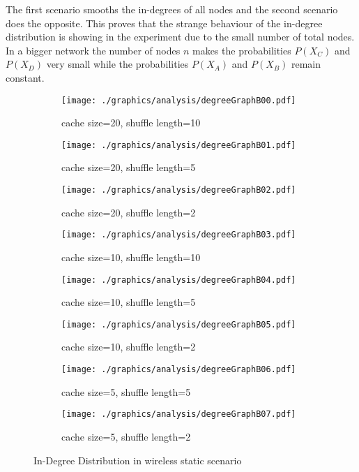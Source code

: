 The first scenario smooths the in-degrees of all nodes and the second
scenario does the opposite. This proves that the strange behaviour of the
in-degree distribution is showing in the experiment due to the small number of
total nodes. In a bigger network the number of nodes $n$ makes the
probabilities $P(X_C)$ and $P(X_D)$ very small while the probabilities $P(X_A)$
and $P(X_B)$ remain constant.

\begin{figure}
\begin{subfigure}{.5\textwidth}
	\texttt{[image: ./graphics/analysis/degreeGraphB00.pdf]}
	\caption{cache size=20, shuffle
	length=10}
	\label{fig:inDegreeDistB00small}
\end{subfigure}%
\begin{subfigure}{.5\textwidth}
	\texttt{[image: ./graphics/analysis/degreeGraphB01.pdf]}
	\caption{cache size=20, shuffle
	length=5}
	\label{fig:inDegreeDistB01small}
\end{subfigure}
\begin{subfigure}{.5\textwidth}
	\texttt{[image: ./graphics/analysis/degreeGraphB02.pdf]}
	\caption{cache size=20, shuffle
	length=2}
	\label{fig:inDegreeDistB02small}
\end{subfigure}%
\begin{subfigure}{.5\textwidth}
	\texttt{[image: ./graphics/analysis/degreeGraphB03.pdf]}
	\caption{cache size=10, shuffle
	length=10}
	\label{fig:inDegreeDistB03small}
\end{subfigure}
\begin{subfigure}{.5\textwidth}
	\texttt{[image: ./graphics/analysis/degreeGraphB04.pdf]}
	\caption{cache size=10, shuffle
	length=5}
	\label{fig:inDegreeDistB04small}
\end{subfigure}%
\begin{subfigure}{.5\textwidth}
	\texttt{[image: ./graphics/analysis/degreeGraphB05.pdf]}
	\caption{cache size=10, shuffle
	length=2}
	\label{fig:inDegreeDistB05small}
\end{subfigure}
\begin{subfigure}{.5\textwidth}
	\texttt{[image: ./graphics/analysis/degreeGraphB06.pdf]}
	\caption{cache size=5, shuffle
	length=5}
	\label{fig:inDegreeDistB06small}
\end{subfigure}%
\begin{subfigure}{.5\textwidth}
	\texttt{[image: ./graphics/analysis/degreeGraphB07.pdf]}
	\caption{cache size=5, shuffle
	length=2}
	\label{fig:inDegreeDistB07small}
\end{subfigure}
\caption{In-Degree Distribution in wireless static scenario}
\end{figure}

